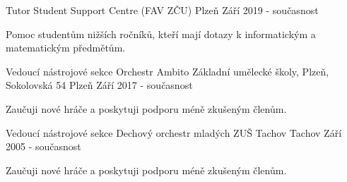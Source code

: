 

\begin{cventries}

  \cventry
    {Tutor} %
    {Student Support Centre (FAV ZČU)} %
    {Plzeň} %
    {Září 2019 - současnost} %
    {
      \begin{cvitems} %
        \item {Pomoc studentům nižších ročníků, kteří mají dotazy k informatickým a matematickým předmětům.}
      \end{cvitems}
    }

  \cventry
    {Vedoucí nástrojové sekce} %
    {Orchestr Ambito Základní umělecké školy, Plzeň, Sokolovská 54} %
    {Plzeň} %
    {Září 2017 - současnost} %
    {
      \begin{cvitems} %
        \item {Zaučuji nové hráče a poskytuji podporu méně zkušeným členům.}
      \end{cvitems}
    }
    
  \cventry
    {Vedoucí nástrojové sekce} %
    {Dechový orchestr mladých ZUŠ Tachov} %
    {Tachov} %
    {Září 2005 - současnost} %
    {
      \begin{cvitems} %
        \item {Zaučuji nové hráče a poskytuji podporu méně zkušeným členům.}
      \end{cvitems}
    }



\end{cventries}
